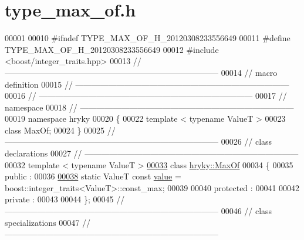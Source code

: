 \hypertarget{type__max__of_8h_source}{\section{type\-\_\-max\-\_\-of.\-h}
}

\begin{DoxyCode}
00001 
00010 \textcolor{preprocessor}{#ifndef TYPE\_MAX\_OF\_H\_20120308233556649}
00011 \textcolor{preprocessor}{}\textcolor{preprocessor}{#define TYPE\_MAX\_OF\_H\_20120308233556649}
00012 \textcolor{preprocessor}{}\textcolor{preprocessor}{#include <boost/integer\_traits.hpp>}
00013 \textcolor{comment}{//
      ------------------------------------------------------------------------------}
00014 \textcolor{comment}{// macro definition}
00015 \textcolor{comment}{//
      ------------------------------------------------------------------------------}
00016 \textcolor{comment}{//
      ------------------------------------------------------------------------------}
00017 \textcolor{comment}{// namespace}
00018 \textcolor{comment}{//
      ------------------------------------------------------------------------------}
00019 \textcolor{keyword}{namespace }hryky
00020 \{
00022     \textcolor{keyword}{template} < \textcolor{keyword}{typename} ValueT >
00023     \textcolor{keyword}{class }MaxOf;
00024 \}
00025 \textcolor{comment}{//
      ------------------------------------------------------------------------------}
00026 \textcolor{comment}{// class declarations}
00027 \textcolor{comment}{//
      ------------------------------------------------------------------------------}
00032 \textcolor{comment}{}\textcolor{keyword}{template} < \textcolor{keyword}{typename} ValueT >
\hypertarget{type__max__of_8h_source_l00033}{}\hyperlink{classhryky_1_1_max_of}{00033} \textcolor{keyword}{class }\hyperlink{classhryky_1_1_max_of}{hryky::MaxOf}
00034 \{
00035 \textcolor{keyword}{public} :
00036 
\hypertarget{type__max__of_8h_source_l00038}{}\hyperlink{classhryky_1_1_max_of_ac1b33ef8eabaa778015f524edd8b9b1d}{00038}     \textcolor{keyword}{static} ValueT \textcolor{keyword}{const} \hyperlink{classhryky_1_1_max_of_ac1b33ef8eabaa778015f524edd8b9b1d}{value} = boost::integer\_traits<ValueT>::const\_max;
00039 
00040 \textcolor{keyword}{protected} :
00041 
00042 \textcolor{keyword}{private} :
00043 
00044 \};
00045 \textcolor{comment}{//
      ------------------------------------------------------------------------------}
00046 \textcolor{comment}{// class specializations}
00047 \textcolor{comment}{//
      ------------------------------------------------------------------------------}

\end{DoxyCode}

